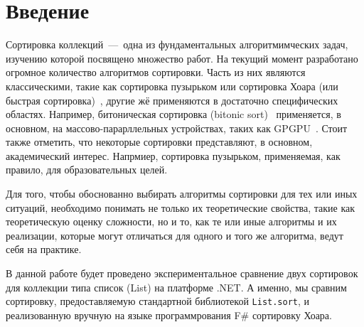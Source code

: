 \section{Введение}

Сортировка коллекций~---~одна из фундаментальных алгоритмимческих задач, изучению которой посвящено множество работ.
На текущий момент разработано огромное количество алгоритмов сортировки.
Часть из них являются классическими, такие как сортировка пузырьком или сортировка Хоара (или быстрая сортировка)~\cite{hoare1962quicksort}, другие жё применяются в достаточно специфических областях. Например, битоническая сортировка (bitonic sort)~\cite{nassimi1979bitonic} применяется, в основном, на массово-парарллельных устройствах, таких как GPGPU~\cite{10.5555/1882792.1882841}.
Стоит также отметить, что некоторые сортировки представляют, в основном, академический интерес.
Напрмиер, сортировка пузырьком, применяемая, как правило, для образовательных целей.

Для того, чтобы обоснованно выбирать алгоритмы сортировки для тех или иных ситуаций, необходимо понимать не только их теоретические свойства, такие как теоретическую оценку сложности, но и то, как те или иные алгоритмы и их реализации, которые могут отличаться для одного и того же алгоритма, ведут себя на практике.

В данной работе будет проведено экспериментальное сравнение двух сортировок для коллекции типа список (List) на платформе .NET.
А именно, мы сравним сортировку, предоставляемую стандартной библиотекой \verb|List.sort|, и реализованную вручную на языке программрования F\# сортировку Хоара. 